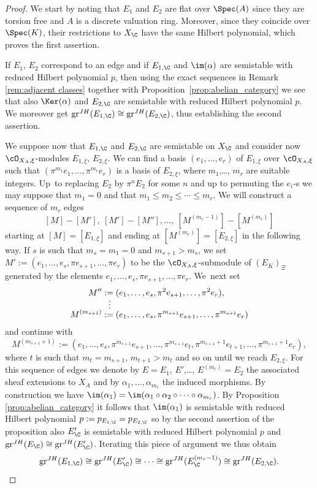 \begin{proof}
We start by noting that $E_1$ and $E_2$ are flat over $\Spec(A)$ since they are torsion free and $A$ is a discrete valuation ring. Moreover, since they coincide over $\Spec(K)$, their restrictions to $X_\C$ have the same Hilbert polynomial, which proves the first assertion.

If $E_1$, $ E_2$ correspond to an edge and if $E_{1,\C}$ and $\im(\alpha)$ are semistable with reduced Hilbert polynomial $p$, then using the exact sequences in Remark \ref{rem:adjacent classes} together with Proposition~\ref{prop:abelian_category} we see that also $\Ker(\alpha)$ and $E_{2,\C}$ are semistable with reduced Hilbert polynomial $p$. We moreover get $\mathrm{gr}^{JH}(E_{1,\C})\cong\mathrm{gr}^{JH}(E_{2,\C})$, thus establishing the second assertion.

We suppose now that $E_{1,\C}$ and $E_{2,\C}$ are semistable on $X_\C$ and consider now $\cO_{X_A,\xi}$-modules $E_{1,\xi}$, $E_{2,\xi}$. We can find a basis $(e_1,\dots,e_r)$ of $E_{1,\xi}$ over $\cO_{X_A,\xi}$ such that $(\pi^{m_1}e_1,\dots,\pi^{m_r}e_r)$ is a basis of $E_{2,\xi}$, where $m_1$,\dots, $m_r$ are suitable integers.
Up~to replacing $E_2$ by $\pi^nE_2$ for some $n$ and up to permuting the $e_i$-s we may suppose that $m_1=0$ and that $m_1\le m_2\le\cdots\le m_r$.
We will construct a sequence of $m_r$ edges
\[
[M] -[M'],\ [M'] -[M''],\dots,\ [M^{(m_{r}-1)}] -[M^{(m_{r})}]
\]
starting at $[M]=[E_{1,\xi}]$ and ending at $ [M^{(m_{r})}]=[E_{2,\xi}]$ in the following way.
If $s$ is such that $m_s=m_1=0$ and $m_{s+1}>m_s$, we set $M':=(e_1,\dots,e_s,\pi e_{s+1},\dots,\pi e_r)$ to be the $\cO_{X_A,\xi}$-submodule of $(E_K)_\Xi$ generated by the elements $e_1,\dots,e_s,\pi e_{s+1},\dots,\pi e_r$.
We~next set
\begin{align*}
M''&:=(e_1,\dots,e_s,\pi^2 e_{s+1},\dots,\pi^2 e_r),\\[-7pt]&\hspace*{2.7mm}\vdots\\[-7pt] M^{(m_{s+1})}&:=(e_1,\dots,e_s,\pi^{m_{s+1}} e_{s+1},\dots,\pi^{m_{s+1}} e_r)
\end{align*}
and continue with
\[
M^{(m_{s+1}+1)}:=(e_1,\dots,e_s,\pi^{m_{s+1}} e_{s+1},\dots,\pi^{m_{s+1}} e_t, \pi^{m_{s+1}+1} e_{t+1},\dots,\pi^{m_{s+1}+1} e_r),
\]
where $t$ is such that $m_t=m_{s+1}$, $m_{t+1}>m_t$ and so on until we reach $E_{2,\xi}$.
For this sequence of edges we denote by $E=E_1$, $E'$,\dots, $E^{(m_r)}=E_2$ the associated sheaf extensions to $X_A$ and by $\alpha_1,\dots, \alpha_{m_r}$ the induced morphisms.
By construction we have $\im(\alpha_1)=\im(\alpha_1\circ\alpha_2\circ\cdots\circ\alpha_{m_r})$.
By Proposition \ref{prop:abelian_category} it follows that $\im(\alpha_1)$ is semistable with reduced Hilbert polynomial $p:=p_{E_{1,\C}}=p_{ E_{2,\C}}$ so by the second assertion of the proposition also $E'_\C$ is semistable with reduced Hilbert polynomial $p$ and $\mathrm{gr}^{JH}(E_\C)\cong\mathrm{gr}^{JH}(E'_\C)$.
Iterating this piece of argument we thus obtain
\[\mathrm{gr}^{JH}(E_{1,\C})\cong\mathrm{gr}^{JH}(E'_\C)\cong\cdots\cong\mathrm{gr}^{JH}(E^{(m_r-1)}_\C)\cong\mathrm{gr}^{JH}(E_{2,\C}). \qedhere\]
\end{proof}

